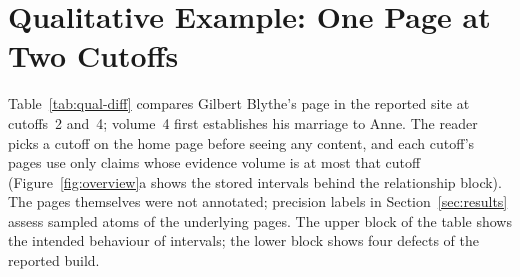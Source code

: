 \section{Qualitative Example: One Page at Two Cutoffs}
\label{app:qualitative}

Table~\ref{tab:qual-diff} compares Gilbert Blythe's page in the reported \sys site at
cutoffs~2 and~4; volume~4 first establishes his marriage to Anne. The reader picks a cutoff
on the home page before seeing any content, and each cutoff's pages use only claims whose
evidence volume is at most that cutoff (Figure~\ref{fig:overview}a shows the stored
intervals behind the relationship block). The pages themselves were not annotated;
precision labels in Section~\ref{sec:results} assess sampled atoms of the underlying pages.
The upper block of the table shows the intended behaviour of intervals; the lower block
shows four defects of the reported build.

